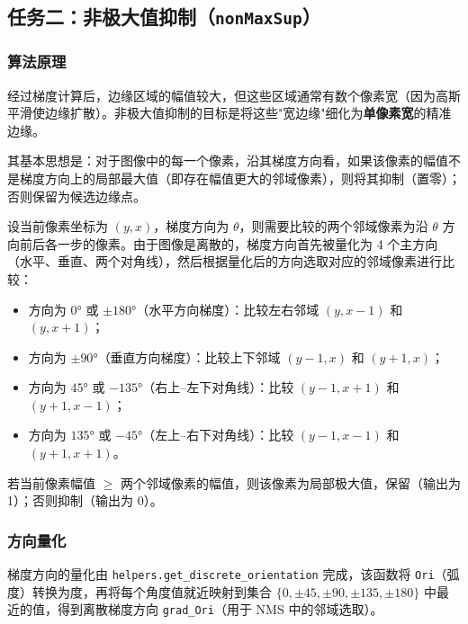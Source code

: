 \documentclass[12pt,a4paper]{ctexart}
\begin{document}
\subsection{任务二：非极大值抑制（\texttt{nonMaxSup}）}

\subsubsection{算法原理}

经过梯度计算后，边缘区域的幅值较大，但这些区域通常有数个像素宽（因为高斯平滑使边缘扩散）。非极大值抑制的目标是将这些"宽边缘"细化为\textbf{单像素宽}的精准边缘。

其基本思想是：对于图像中的每一个像素，沿其梯度方向看，如果该像素的幅值不是梯度方向上的局部最大值（即存在幅值更大的邻域像素），则将其抑制（置零）；否则保留为候选边缘点。

设当前像素坐标为 $(y, x)$，梯度方向为 $\theta$，则需要比较的两个邻域像素为沿 $\theta$ 方向前后各一步的像素。由于图像是离散的，梯度方向首先被量化为 4 个主方向（水平、垂直、两个对角线），然后根据量化后的方向选取对应的邻域像素进行比较：

\begin{itemize}
  \item 方向为 $0°$ 或 $\pm 180°$（水平方向梯度）：比较左右邻域 $(y, x-1)$ 和 $(y, x+1)$；
  \item 方向为 $\pm 90°$（垂直方向梯度）：比较上下邻域 $(y-1, x)$ 和 $(y+1, x)$；
  \item 方向为 $45°$ 或 $-135°$（右上--左下对角线）：比较 $(y-1, x+1)$ 和 $(y+1, x-1)$；
  \item 方向为 $135°$ 或 $-45°$（左上--右下对角线）：比较 $(y-1, x-1)$ 和 $(y+1, x+1)$。
\end{itemize}

若当前像素幅值 $\geq$ 两个邻域像素的幅值，则该像素为局部极大值，保留（输出为 1）；否则抑制（输出为 0）。

\subsubsection{方向量化}

梯度方向的量化由 \texttt{helpers.get\_discrete\_orientation} 完成，该函数将 \texttt{Ori}（弧度）转换为度，再将每个角度值就近映射到集合 $\{0, \pm45, \pm90, \pm135, \pm180\}$ 中最近的值，得到离散梯度方向 \texttt{grad\_Ori}（用于 NMS 中的邻域选取）。
\end{document}
